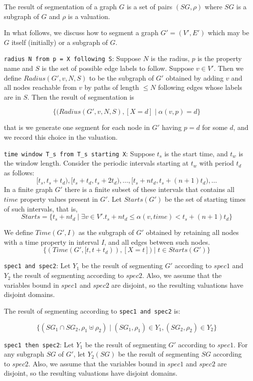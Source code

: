 \documentclass{article}
\begin{document}
The result of segmentation of a graph $G$ is a set of pairs
$(SG,\rho)$ where $SG$ is a subgraph of $G$ and $\rho$ is a
valuation.  


In what follows, we discuss how to segment a graph $G' = (V',E')$ which may be
$G$ itself (initially) or a subgraph of $G$.  

\verb|radius N from p = X following S|: Suppose $N$ is the radius, $p$
is the property name and $S$ is the set of possible edge labels to
follow.  Suppose $v \in V'$.  Then we define $Radius(G',v,N,S)$ to be the
subgraph of $G'$ obtained by adding $v$ and all nodes reachable from
$v$ by paths of length $\leq N$ following edges whose labels are in
$S$.  Then the result of segmentation is 

\[\{ (Radius(G',v,N,S),[X=d] \mid \alpha(v,p) = d\}\]

that is we generate one segment for each node in $G'$ having $p = d$
for some $d$, and we record this choice in the valuation.


\verb|time window T_s from T_s starting X|: Suppose $t_s$ is the start
time, and $t_w$ is the window length.  Consider the periodic intervals
starting at $t_w$ with period $t_d$ as follows:
\[[t_s, t_s+t_d), [t_s + t_d, t_s + 2t_d), \ldots, [t_s+nt_d, t_s +
(n+1)t_d),\ldots\]
 In a finite graph
$G'$ there is a finite subset of these intervals that contains all
$time$ property values present in $G'$.  Let $Starts(G')$ be the set of
starting times of such intervals, that is, 
\[Starts = \{t_s + nt_d \mid \exists v \in V'. t_s+nt_d \leq
\alpha(v,time) < t_s + (n+1)t_d\}\]

 We define $Time(G',I)$ as the subgraph of $G'$ obtained by
retaining all nodes with a time property in interval $I$, and all
edges between such nodes.
\[\{(Time(G',[t,t+t_d)), [X=t]) \mid t \in Starts(G')\}\]


\verb|spec1 and spec2|: Let $Y_1$ be the result of segmenting $G'$
according to $spec1$ and $Y_2$ the result of segmenting according to
$spec2$.  Also, we assume that the variables bound in $spec1$ and
$spec2$ are disjoint, so the resulting valuations have disjoint domains.

  The result of segmenting according to \verb|spec1 and spec2| is:

\[\{(SG_1 \cap SG_2, \rho_1 \uplus \rho_2)  \mid (SG_1,\rho_1) \in
Y_1, (SG_2,\rho_2) \in Y_2\}\]

\verb|spec1 then spec2|: Let $Y_1$ be the result of segmenting
$G'$ according to $spec1$.  For any subgraph $SG$ of $G'$, let $Y_2(SG)$ be
the result of segmenting $SG$ according to $spec2$.  Also, we assume that the variables bound in $spec1$ and
$spec2$ are disjoint, so the resulting valuations have disjoint
domains.  
\end{document}
